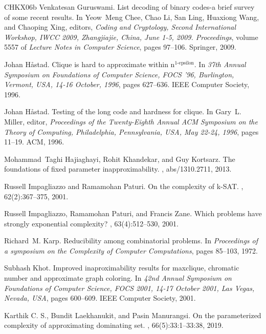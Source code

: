 \documentclass[10pt,a4paper]{article}
\begin{document}
\begin{thebibliography}{CHKX06b}
Venkatesan Guruswami.
\newblock List decoding of binary codes-a brief survey of some recent results.
\newblock In Yeow~Meng Chee, Chao Li, San Ling, Huaxiong Wang, and Chaoping
  Xing, editors, {\em Coding and Cryptology, Second International Workshop,
  {IWCC} 2009, Zhangjiajie, China, June 1-5, 2009. Proceedings}, volume 5557 of
  {\em Lecture Notes in Computer Science}, pages 97--106. Springer, 2009.

Johan H{\aa}stad.
\newblock Clique is hard to approximate within n\({}^{\mbox{1-epsilon}}\).
\newblock In {\em 37th Annual Symposium on Foundations of Computer Science,
  {FOCS} '96, Burlington, Vermont, USA, 14-16 October, 1996}, pages 627--636.
  {IEEE} Computer Society, 1996.

Johan H{\aa}stad.
\newblock Testing of the long code and hardness for clique.
\newblock In Gary~L. Miller, editor, {\em Proceedings of the Twenty-Eighth
  Annual {ACM} Symposium on the Theory of Computing, Philadelphia,
  Pennsylvania, USA, May 22-24, 1996}, pages 11--19. {ACM}, 1996.

Mohammad~Taghi Hajiaghayi, Rohit Khandekar, and Guy Kortsarz.
\newblock The foundations of fixed parameter inapproximability.
, abs/1310.2711, 2013.

Russell Impagliazzo and Ramamohan Paturi.
\newblock On the complexity of k-{SAT}.
, 62(2):367--375, 2001.

Russell Impagliazzo, Ramamohan Paturi, and Francis Zane.
\newblock Which problems have strongly exponential complexity?
, 63(4):512--530, 2001.

Richard~M. Karp.
\newblock Reducibility among combinatorial problems.
\newblock In {\em Proceedings of a symposium on the Complexity of Computer
  Computations}, pages 85--103, 1972.

Subhash Khot.
\newblock Improved inaproximability results for maxclique, chromatic number and
  approximate graph coloring.
\newblock In {\em 42nd Annual Symposium on Foundations of Computer Science,
  {FOCS} 2001, 14-17 October 2001, Las Vegas, Nevada, {USA}}, pages 600--609.
  {IEEE} Computer Society, 2001.

{Karthik {C. S.}}, Bundit Laekhanukit, and Pasin Manurangsi.
\newblock On the parameterized complexity of approximating dominating set.
, 66(5):33:1--33:38, 2019.


\end{thebibliography}
\end{document}
